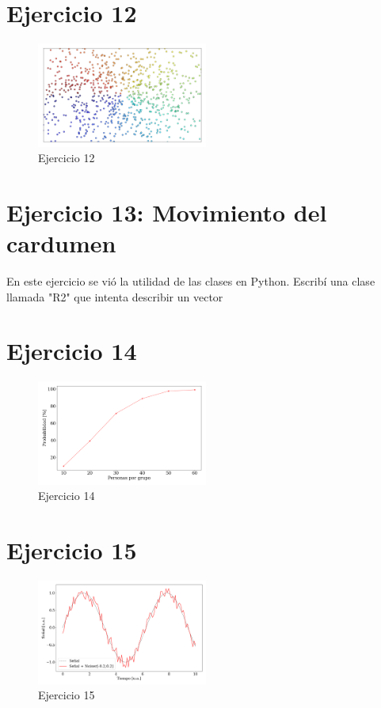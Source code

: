 \section*{Ejercicio 12}

\begin{figure}[H]
	\centering
	\includegraphics[width=0.5\textwidth]{ejer_12.png}
	\caption{Ejercicio 12}
	\label{fig:ejer12}
\end{figure}
	

\section*{Ejercicio 13: Movimiento del cardumen}

En este ejercicio se vió la utilidad de las clases en Python. Escribí una clase llamada "R2" que intenta describir un vector




\section*{Ejercicio 14}

\begin{figure}[H]
	\centering
	\includegraphics[width=0.5\textwidth]{ejer_14.png}
	\caption{Ejercicio 14}
	\label{fig:ejer14}
\end{figure}
	

\section*{Ejercicio 15}

\begin{figure}[H]
	\centering
	\includegraphics[width=0.5\textwidth]{ejer_15.png}
	\caption{Ejercicio 15}
	\label{fig:ejer15}
\end{figure}
	

